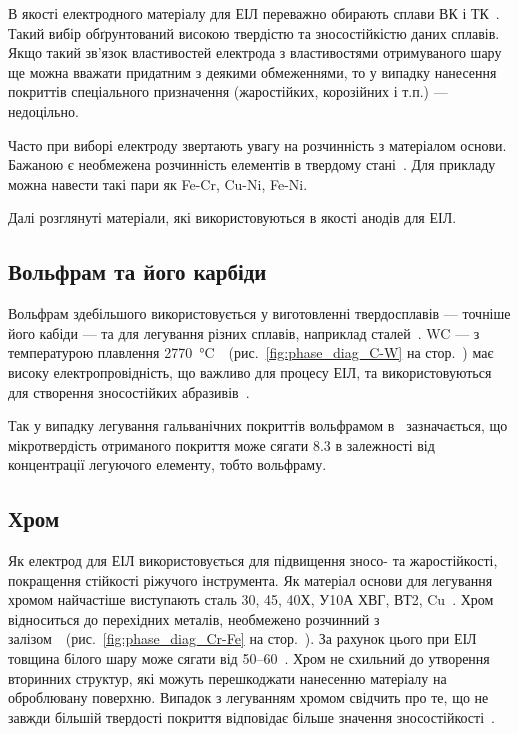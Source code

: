 \documentclass[a4paper,fontsize=14bp,ukrainian]{extreport}
\begin{document}
В якості електродного матеріалу для ЕІЛ переважно обирають сплави ВК і ТК~\cite{yarkov2004}. Такий вибір обґрунтований високою твердістю та зносостійкістю даних сплавів. Якщо такий зв'язок властивостей електрода з властивостями отримуваного шару ще можна вважати придатним з деякими обмеженнями, то у випадку нанесення покриттів спеціального призначення (жаростійких, корозійних і т.п.) --- недоцільно.

Часто при виборі електроду звертають увагу на розчинність з матеріалом основи. Бажаною є необмежена розчинність елементів в твердому стані~\cite{yarkov2004}. Для прикладу можна навести такі пари як Fe-Cr, Cu-Ni, Fe-Ni.

Далі розглянуті матеріали, які використовуються в якості анодів для ЕІЛ.

\subsection{Вольфрам та його карбіди}
\label{subsec:tungsten}

Вольфрам здебільшого використовується у виготовленні твердосплавів --- точніше його кабіди --- та для легування різних сплавів, наприклад сталей~\cite{eltit}. WC --- з температурою плавлення \SI{2770}{\degreeCelsius}~\cite{diag1997t1}~(рис.~\ref{fig:phase_diag_C-W} на стор.~\pageref{fig:phase_diag_C-W}) має високу електропровідність, що важливо для процесу ЕІЛ, та використовуються для створення зносостійких абразивів~\cite{daintith2014chemistry}.

Так у випадку легування гальванічних покриттів вольфрамом в~\cite{serebrovsky2012} зазначається, що мікротвердість отриманого покриття може сягати \SI{8.3}{\gpa} в залежності від концентрації легуючого елементу, тобто вольфраму.

\subsection{Хром}
\label{subsec:chrome}

Як електрод для ЕІЛ використовується для підвищення зносо- та жаростійкості, покращення стійкості ріжучого інструмента. Як матеріал основи для легування хромом найчастіше виступають сталь 30, 45, 40Х, У10А ХВГ, ВТ2, Cu~\cite{yarkov2004}. Хром відноситься до перехідних металів, необмежено розчинний з залізом~\cite{diag1997t2}~(рис.~\ref{fig:phase_diag_Cr-Fe} на стор.~\pageref{fig:phase_diag_Cr-Fe}). За рахунок цього при ЕІЛ товщина білого шару може сягати від \SIrange{50}{60}{\mkm}~\cite{sydorenko2013}. Хром не схильний до утворення вторинних структур, які можуть перешкоджати нанесенню матеріалу на оброблювану поверхню.
Випадок з легуванням хромом свідчить про те, що не завжди більшій твердості покриття відповідає більше значення зносостійкості~\cite{hitlevich1985}.
\end{document}
